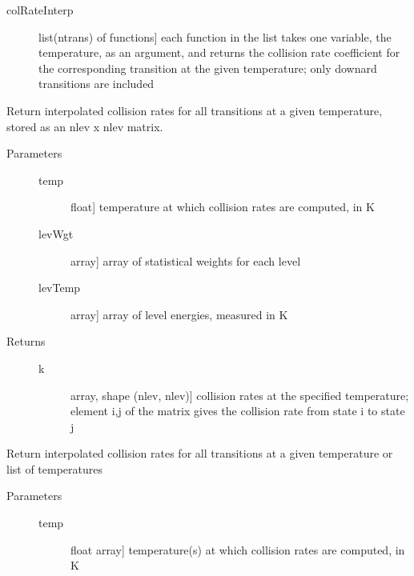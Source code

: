 \documentclass[letterpaper,10pt,english]{sphinxmanual}
\begin{document}
\begin{fulllineitems}
\begin{description}
\begin{description}
\item[{colRateInterp}] \leavevmode{[}list(ntrans) of functions{]}
each function in the list takes one variable, the temperature,
as an argument, and returns the collision rate coefficient for
the corresponding transition at the given temperature; only
downard transitions are included

\end{description}

\end{description}

\begin{fulllineitems}
\label{fulldoc:despotic.collPartner.colRateMatrix}
Return interpolated collision rates for all transitions at a
given temperature, stored as an nlev x nlev matrix.
\begin{description}
\item[{Parameters}] \leavevmode\begin{description}
\item[{temp}] \leavevmode{[}float{]}
temperature at which collision rates are computed, in K

\item[{levWgt}] \leavevmode{[}array{]}
array of statistical weights for each level

\item[{levTemp}] \leavevmode{[}array{]}
array of level energies, measured in K

\end{description}

\item[{Returns}] \leavevmode\begin{description}
\item[{k}] \leavevmode{[}array, shape (nlev, nlev){]}
collision rates at the specified temperature; element i,j
of the matrix gives the collision rate from state i to
state j

\end{description}

\end{description}

\end{fulllineitems}


\begin{fulllineitems}
\label{fulldoc:despotic.collPartner.colRates}
Return interpolated collision rates for all transitions at a
given temperature or list of temperatures
\begin{description}
\item[{Parameters}] \leavevmode\begin{description}
\item[{temp}] \leavevmode{[}float \textbar{} array{]}
temperature(s) at which collision rates are computed, in K


\end{description}
\end{description}
\end{fulllineitems}
\end{fulllineitems}
\end{document}

